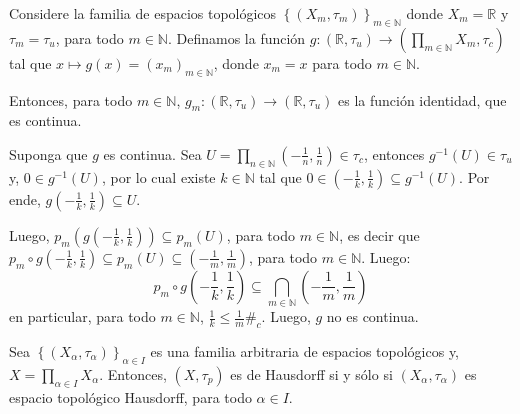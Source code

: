\documentclass[12pt]{report}
\theoremstyle{largebreak}
\newcommand\cf[3]{\ensuremath{#1:#2\rightarrow#3}}
\newcommand\contradiction{\ensuremath{\#_c}}
\begin{document}
    \begin{exa}
        Considere la familia de espacios topológicos $\left\{(X_m,\tau_m) \right\}_{m\in\mathbb{N}}$ donde $X_m=\mathbb{R}$ y $\tau_m=\tau_u$, para todo $m\in\mathbb{N}$. Definamos la función $\cf{g}{(\mathbb{R},\tau_u)}{\left(\prod_{m\in\mathbb{N}}X_m,\tau_c \right)}$ tal que $x\mapsto g(x)=\left(x_m \right)_{m\in\mathbb{N}}$, donde $x_m=x$ para todo $m\in\mathbb{N}$.

        Entonces, para todo $m\in\mathbb{N}$, $\cf{g_m}{(\mathbb{R},\tau_u)}{(\mathbb{R},\tau_u)}$ es la función identidad, que es continua.

        Suponga que $g$ es continua. Sea $U=\prod_{n\in\mathbb{N}}\left(-\frac{1}{n},\frac{1}{n}\right)\in\tau_c$, entonces $g^{-1}(U)\in\tau_u$ y, $0\in g^{-1}(U)$, por lo cual existe $k\in\mathbb{N}$ tal que $0\in\left(-\frac{1}{k},\frac{1}{k} \right)\subseteq g^{-1}(U)$. Por ende, $g\left(-\frac{1}{k},\frac{1}{k} \right)\subseteq U$.

        Luego, $p_m\left(g\left(-\frac{1}{k},\frac{1}{k} \right)\right)\subseteq p_m(U)$, para todo $m\in\mathbb{N}$, es decir que $p_m\circ g\left(-\frac{1}{k},\frac{1}{k} \right)\subseteq p_m(U)\subseteq\left(-\frac{1}{m},\frac{1}{m} \right)$, para todo $m\in\mathbb{N}$. Luego:
        \begin{equation*}
            p_m\circ g\left(-\frac{1}{k},\frac{1}{k} \right)\subseteq\bigcap_{ m\in\mathbb{N}}\left(-\frac{1}{m},\frac{1}{m} \right)
        \end{equation*}
        en particular, para todo $m\in\mathbb{N}$, $\frac{1}{k}\leq\frac{1}{m}$\contradiction. Luego, $g$ no es continua.
    \end{exa}

    \begin{propo}
        Sea $\left\{(X_\alpha,\tau_\alpha) \right\}_{\alpha\in I}$ es una familia arbitraria de espacios topológicos y, $X=\prod_{\alpha\in I}X_\alpha$. Entonces, $(X,\tau_p)$ es de Hausdorff si y sólo si $(X_\alpha,\tau_\alpha)$ es espacio topológico Hausdorff, para todo $\alpha\in I$.
    \end{propo}
\end{document}
